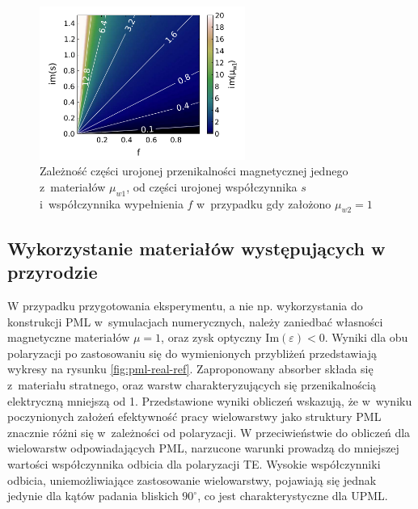 \begin{figure}
	\includegraphics[width=0.6\textwidth]{images/pml/fig4.png}
	\caption{Zależność części urojonej przenikalności magnetycznej jednego z~materiałów $\mu_{w1}$, od części urojonej współczynnika $s$ i~współczynnika wypełnienia $f$ w~przypadku gdy założono $\mu_{w2}=1$}
	\label{fig:im-mu1}
\end{figure}

\subsection{Wykorzystanie materiałów występujących w przyrodzie}

W przypadku przygotowania eksperymentu, a nie np. wykorzystania do konstrukcji PML w~symulacjach  numerycznych, należy zaniedbać własności magnetyczne materiałów $\mu=1$, oraz zysk optyczny $\textrm{Im}(\varepsilon)<0$. Wyniki dla obu polaryzacji po zastosowaniu się do wymienionych przybliżeń przedstawiają wykresy na rysunku \ref{fig:pml-real-ref}. Zaproponowany absorber składa się z~materiału stratnego, oraz warstw charakteryzujących się przenikalnością elektryczną mniejszą od 1. Przedstawione wyniki obliczeń wskazują, że w~wyniku poczynionych założeń efektywność pracy wielowarstwy jako struktury PML znacznie różni się w~zależności od polaryzacji. W przeciwieństwie do obliczeń dla wielowarstw odpowiadających PML, narzucone warunki prowadzą do mniejszej wartości współczynnika odbicia dla polaryzacji TE. Wysokie współczynniki odbicia, uniemożliwiające zastosowanie wielowarstwy,  pojawiają się jednak jedynie dla kątów padania bliskich $90^{\circ}$, co jest charakterystyczne dla UPML.

